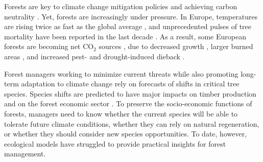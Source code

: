 \documentclass[11pt,letter]{article}
\begin{document}

Forests are key to climate change mitigation policies and achieving carbon neutrality  \citep{Korosuo2023, Hyyrynen2023}. Yet, forests are increasingly under pressure. In Europe, temperatures are rising twice as fast as the global average \citep{CCCS2024}, and unprecedented pulses of tree mortality  have been reported in the last decade \citep{Senf2020}. As a result, some European forests are becoming net CO$_2$ sources \citep{Hadden2016, Karelin2021}, due to decreased growth \citep{Hadden2016, Woude2023}, larger burned areas \citep{Carnicer2022, Kelly2024}, and increased pest- and drought-induced dieback \citep{Karelin2021, Cienciala2024, Latifovic2024}. 

Forest managers working to minimize current threats while also promoting long-term adaptation to climate change rely on forecasts of shifts in critical tree species. Species shifts are predicted to have major impacts on timber production and on the forest economic sector \citep{Wessely2024, Hanewinkel2013}. To preserve the socio-economic functions of forests, managers need to know whether the current species will be able to tolerate future climate conditions, whether they can rely on natural regeneration, or whether they should consider new species opportunities. To date, however, ecological models have struggled to provide practical insights for forest management.
\end{document}
